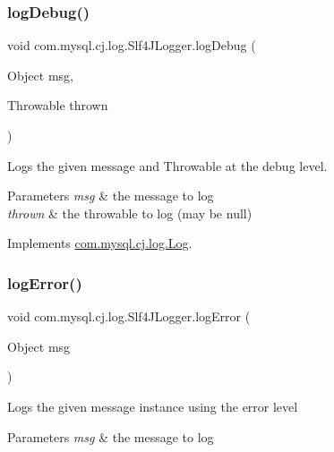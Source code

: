 \subsubsection{\texorpdfstring{log\+Debug()}{logDebug()}\hspace{0.1cm}{\footnotesize\ttfamily [2/2]}}
{\footnotesize\ttfamily void com.\+mysql.\+cj.\+log.\+Slf4\+J\+Logger.\+log\+Debug (\begin{DoxyParamCaption}\item[{Object}]{msg,  }\item[{Throwable}]{thrown }\end{DoxyParamCaption})}

Logs the given message and Throwable at the \textquotesingle{}debug\textquotesingle{} level.


\begin{DoxyParams}{Parameters}
{\em msg} & the message to log \\
\hline
{\em thrown} & the throwable to log (may be null) \\
\hline
\end{DoxyParams}


Implements \mbox{\hyperlink{interfacecom_1_1mysql_1_1cj_1_1log_1_1_log_a42c9900bc643b771d7e337686ac4f799}{com.\+mysql.\+cj.\+log.\+Log}}.

\mbox{\label{classcom_1_1mysql_1_1cj_1_1log_1_1_slf4_j_logger_a1a99e9a4f586e0678a68d1145cd26bc5}} 
\subsubsection{\texorpdfstring{log\+Error()}{logError()}\hspace{0.1cm}{\footnotesize\ttfamily [1/2]}}
{\footnotesize\ttfamily void com.\+mysql.\+cj.\+log.\+Slf4\+J\+Logger.\+log\+Error (\begin{DoxyParamCaption}\item[{Object}]{msg }\end{DoxyParamCaption})}

Logs the given message instance using the \textquotesingle{}error\textquotesingle{} level


\begin{DoxyParams}{Parameters}
{\em msg} & the message to log \\
\hline
\end{DoxyParams}


